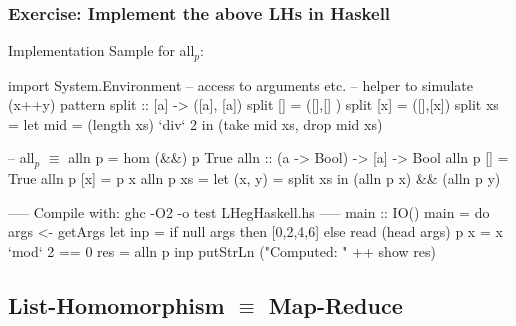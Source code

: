 \documentclass{beamer}
\renewcommand{\emph}[1]{\textcolor{structure}{#1}}
\newcommand{\emp}[1]{\textcolor{DikuRed}{ #1}}
\newcommand{\mymath}[1]{$ #1 $}
\newcommand{\myindx}[1]{_{#1}}
\begin{document}
\begin{frame}[fragile,t]
  \frametitle{Exercise: Implement the above LHs in Haskell}

\begin{block}{Implementation Sample for all$_p$:} 
\begin{colorcode}[fontsize=\scriptsize]
import System.Environment -- access to arguments etc.
-- helper to simulate (x++y) pattern
split :: [a] -> ([a], [a])
split []  = ([],[] )
split [x] = ([],[x]) 
split xs  = let mid = (length xs) `div` 2  in  (take mid xs, drop mid xs)

-- \emph{all\mymath{\myindx{p}}} \mymath{\equiv} \emph{alln p} = \emp{hom (&&) p True}
\emph{alln} :: (a -> Bool) -> [a] -> Bool
\emph{alln p} []     = True
\emph{alln p} [x]    = p x
\emph{alln p} xs     = let (x, y) = split xs   in   (\emph{alln p} x) && (\emph{alln p} y)

----- Compile with: ghc -O2 -o test LHegHaskell.hs -----
main :: IO()
main = do args <- getArgs
          let inp = if null args then [0,2,4,6] else read (head args)
              p x = x `mod` 2 == 0
              res = alln p inp  
          putStrLn ("Computed: " ++ show res)
\end{colorcode}
\end{block}
\end{frame}

\subsection{List-Homomorphism $\equiv$ Map-Reduce}
\begin{frame}[fragile]
	\tableofcontents[currentsubsection]
\end{frame}
\end{document}
